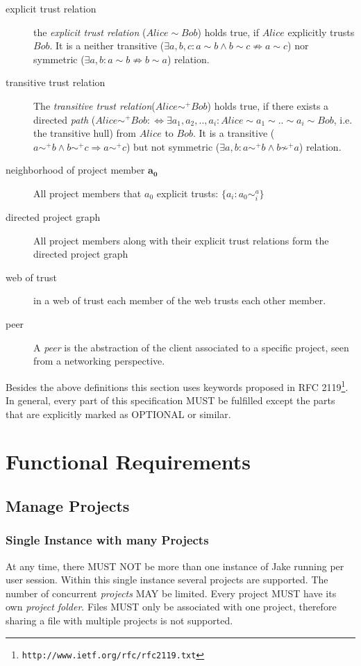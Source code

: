 \begin{description}
\item[explicit trust relation] the \emph{explicit trust relation} ($Alice \sim Bob$) holds true, if $Alice$ explicitly trusts $Bob$. It is a neither transitive ($\exists a, b, c: a \sim b \wedge b \sim c \not\Rightarrow a \sim c$) nor symmetric ($\exists a, b: a \sim b \not\Rightarrow b \sim a$) relation.
\item[transitive trust relation] The \emph{transitive trust relation}($Alice \sim ^+ Bob$) holds true, if there exists a directed \emph{path} ($Alice \sim ^+ Bob : \Leftrightarrow \exists a_1, a_2, .., a_i: Alice \sim a_1 \sim ..\sim a_i \sim Bob$, i.e. the transitive hull) from $Alice$ to $Bob$. It is a transitive ($a \sim ^+ b \wedge b \sim ^+ c \Rightarrow a \sim ^+ c$) but not symmetric ($\exists a, b: a \sim ^+ b \wedge b \not\sim ^+ a$) relation.
\item[neighborhood of project member $\mathbf{a_0}$] All project members that $a_0$ explicit trusts: $\{a_i: a_0 \sim ^ a_i\}$
\item[directed project graph] All project members along with their explicit trust relations form the directed project graph
\item[web of trust] in a web of trust each member of the web trusts each other member.
\item[peer] A \emph{peer} is the abstraction of the client associated to a specific project, seen from a networking perspective.
\end{description}

Besides the above definitions this section uses keywords proposed in RFC 2119\footnote{\texttt{http://www.ietf.org/rfc/rfc2119.txt}}. In general, every part of this specification MUST be fulfilled except the parts that are explicitly marked as OPTIONAL or similar.

\section{Functional Requirements}

\subsection{Manage Projects}
\subsubsection{Single Instance with many Projects}
At any time, there MUST NOT be more than one instance of Jake running per user session. Within this single instance several projects are supported. The number of concurrent \emph{projects} MAY be limited. Every project MUST have its own \emph{project folder}. Files MUST only be associated with one project, therefore sharing a file with multiple projects is not supported.


